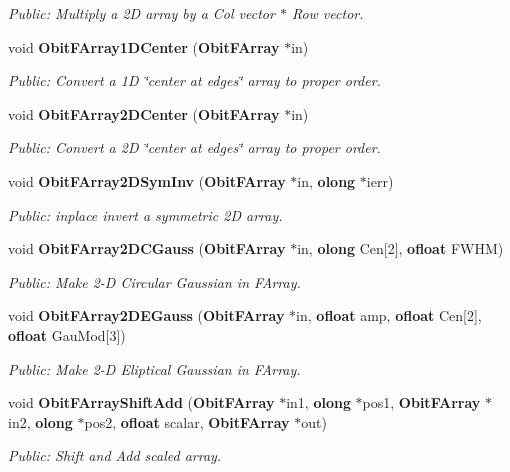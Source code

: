 \begin{CompactItemize}
\begin{CompactList}\small\item\em Public: Multiply a 2D array by a Col vector $\ast$ Row vector. \item\end{CompactList}\item 
void {\bf Obit\-FArray1DCenter} ({\bf Obit\-FArray} $\ast$in)
\begin{CompactList}\small\item\em Public: Convert a 1D \char`\"{}center at edges\char`\"{} array to proper order. \item\end{CompactList}\item 
void {\bf Obit\-FArray2DCenter} ({\bf Obit\-FArray} $\ast$in)
\begin{CompactList}\small\item\em Public: Convert a 2D \char`\"{}center at edges\char`\"{} array to proper order. \item\end{CompactList}\item 
void {\bf Obit\-FArray2DSym\-Inv} ({\bf Obit\-FArray} $\ast$in, {\bf olong} $\ast$ierr)
\begin{CompactList}\small\item\em Public: inplace invert a symmetric 2D array. \item\end{CompactList}\item 
void {\bf Obit\-FArray2DCGauss} ({\bf Obit\-FArray} $\ast$in, {\bf olong} Cen[2], {\bf ofloat} FWHM)
\begin{CompactList}\small\item\em Public: Make 2-D Circular Gaussian in FArray. \item\end{CompactList}\item 
void {\bf Obit\-FArray2DEGauss} ({\bf Obit\-FArray} $\ast$in, {\bf ofloat} amp, {\bf ofloat} Cen[2], {\bf ofloat} Gau\-Mod[3])
\begin{CompactList}\small\item\em Public: Make 2-D Eliptical Gaussian in FArray. \item\end{CompactList}\item 
void {\bf Obit\-FArray\-Shift\-Add} ({\bf Obit\-FArray} $\ast$in1, {\bf olong} $\ast$pos1, {\bf Obit\-FArray} $\ast$in2, {\bf olong} $\ast$pos2, {\bf ofloat} scalar, {\bf Obit\-FArray} $\ast$out)
\begin{CompactList}\small\item\em Public: Shift and Add scaled array. \item\end{CompactList}\item 

\end{CompactItemize}
